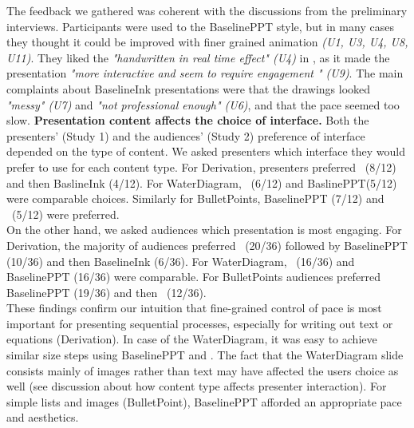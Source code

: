 The feedback we gathered was coherent with the discussions from the preliminary interviews.  Participants were used to the BaselinePPT style, but in many cases they thought it could be improved with finer grained animation \textit{(U1, U3, U4, U8, U11)}. They liked the \textit{"handwritten in real time effect" (U4)}   in \interface, as it made the presentation \textit{"more interactive and seem to require engagement " (U9)}. The main complaints about BaselineInk presentations were that the drawings looked \textit{"messy" (U7)} and \textit{"not professional enough" (U6)}, and that the pace seemed too slow.
%
\textbf{Presentation content affects the choice of interface.}
Both the presenters' (Study 1) and the audiences' (Study 2) preference of interface depended on the type of content. We asked presenters which interface they would prefer to use for each content type. For Derivation, presenters preferred  \interface\ (8/12) and then BaslineInk (4/12). For WaterDiagram, \interface\ (6/12) and BaslinePPT(5/12) were comparable choices. Similarly for BulletPoints, BaselinePPT (7/12) and \interface\ (5/12) were preferred.\\ 
On the other hand, we asked audiences which presentation is most engaging. For Derivation, the majority of audiences preferred \interface\ (20/36) followed by BaselinePPT (10/36) and then BaselineInk (6/36). For WaterDiagram, \interface\ (16/36) and BaselinePPT (16/36) were comparable. For BulletPoints audiences preferred BaselinePPT (19/36) and then \interface\ (12/36).\\
These findings confirm our intuition that fine-grained control of pace is most important for presenting sequential processes, especially for writing out text or equations (Derivation). In case of the WaterDiagram, it was easy to achieve similar size steps using BaselinePPT and \interface. The fact that the WaterDiagram slide consists mainly of images rather than text may have affected the users choice as well (see discussion about how content type affects presenter interaction).  For simple lists and images (BulletPoint), BaselinePPT afforded an appropriate pace and aesthetics.